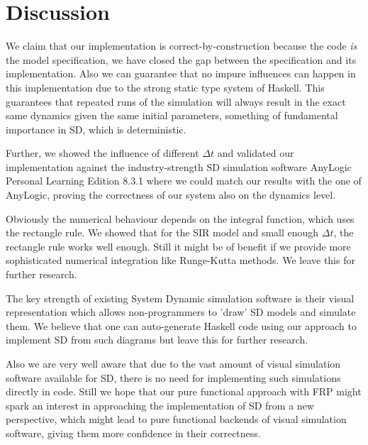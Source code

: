 \section{Discussion}
We claim that our implementation is correct-by-construction because the code \textit{is} the model specification, we have closed the gap between the specification and its implementation. Also we can guarantee that no impure influences can happen in this implementation due to the strong static type system of Haskell. This guarantees that repeated runs of the simulation will always result in the exact same dynamics given the same initial parameters, something of fundamental importance in SD, which is deterministic.


Further, we showed the influence of different $\Delta t$ and validated our implementation against the industry-strength SD simulation software AnyLogic Personal Learning Edition 8.3.1 where we could match our results with the one of AnyLogic, proving the correctness of our system also on the dynamics level.

Obviously the numerical behaviour depends on the integral function, which uses the rectangle rule. We showed that for the SIR model and small enough $\Delta t$, the rectangle rule works well enough. Still it might be of benefit if we provide more sophisticated numerical integration like Runge-Kutta methods. We leave this for further research.

The key strength of existing System Dynamic simulation software is their visual representation which allows non-programmers to 'draw' SD models and simulate them. We believe that one can auto-generate Haskell code using our approach to implement SD from such diagrams but leave this for further research.

Also we are very well aware that due to the vast amount of visual simulation software available for SD, there is no need for implementing such simulations directly in code. Still we hope that our pure functional approach with FRP might spark an interest in approaching the implementation of SD from a new perspective, which might lead to pure functional backends of visual simulation software, giving them more confidence in their correctness.

